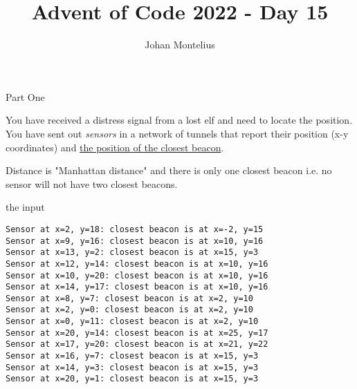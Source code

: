 

\title[ID1019 Advent of Code 2022 - Day 15]{Advent of Code 2022 - Day 15}


\author{Johan Montelius}
\date{\semester}



\begin{frame}
\titlepage
\end{frame}

\begin{frame}{Part One}

  You have received a distress signal from a lost elf and need to
  locate the position. You have sent out {\em sensors} in a network of
  tunnels that report their position (x-y coordinates) and
  \underline{the position of the closest beacon}.

  \vspace{40pt} \pause Distance is "Manhattan distance" and there is
  only one closest beacon i.e. no sensor will not have two closest beacons.
  
\end{frame}


\begin{frame}[fragile]{the input}


  \tiny{
    \begin{verbatim}
Sensor at x=2, y=18: closest beacon is at x=-2, y=15
Sensor at x=9, y=16: closest beacon is at x=10, y=16
Sensor at x=13, y=2: closest beacon is at x=15, y=3
Sensor at x=12, y=14: closest beacon is at x=10, y=16
Sensor at x=10, y=20: closest beacon is at x=10, y=16
Sensor at x=14, y=17: closest beacon is at x=10, y=16
Sensor at x=8, y=7: closest beacon is at x=2, y=10
Sensor at x=2, y=0: closest beacon is at x=2, y=10
Sensor at x=0, y=11: closest beacon is at x=2, y=10
Sensor at x=20, y=14: closest beacon is at x=25, y=17
Sensor at x=17, y=20: closest beacon is at x=21, y=22
Sensor at x=16, y=7: closest beacon is at x=15, y=3
Sensor at x=14, y=3: closest beacon is at x=15, y=3
Sensor at x=20, y=1: closest beacon is at x=15, y=3
\end{verbatim}
    }

\end{frame}


